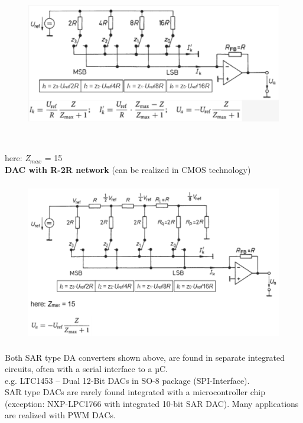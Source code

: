     \begin{figure}[h]
    \centering
    \includegraphics[width=14cm, height=7cm]{Images/image32.png}
    \label{fig:Fig }
    \end{figure}

here: \textit{Z}${}_{max}$ = 15\\

{\rot\bf DAC with R-2R network} (can be realized in CMOS technology)

    \begin{figure}[h]
    \centering
    \includegraphics[width=14cm, height=7cm]{Images/image166.png}
    \label{fig:Fig }
    \end{figure}

Both SAR type DA converters shown above, are found in separate integrated circuits, often with a serial interface to a µC. \\

e.g. LTC1453 -- Dual 12-Bit DACs in SO-8 package (SPI-Interface).\\

SAR type DACs are rarely found integrated with a microcontroller chip (exception: NXP-LPC1766 with integrated 10-bit SAR DAC). Many applications are realized with PWM DACs.
\newpage

